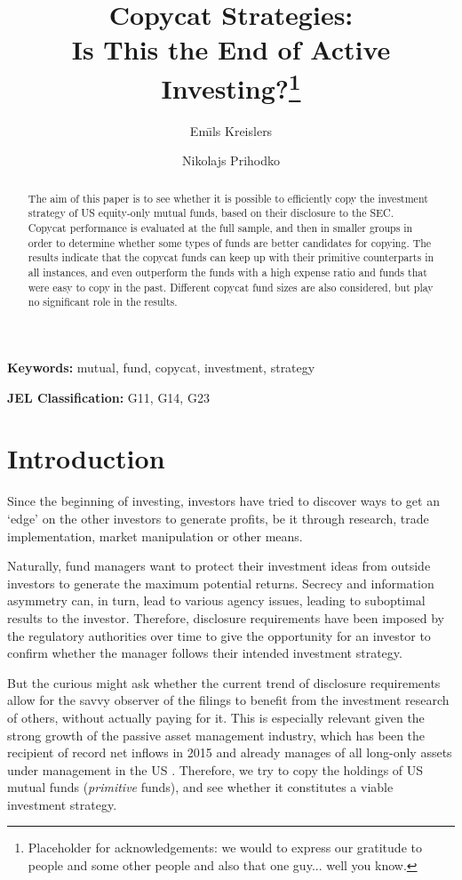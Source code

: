 \documentclass[12pt, a4]{article}
\title{Copycat Strategies:\\ Is This the End of Active Investing?\thanks{Placeholder for acknowledgements: we would to express our gratitude to people and some other people and also that one guy... well you know.}}
\author{Em\={\i}ls Kreislers \and Nikolajs Prihodko}
\date{\parbox{\linewidth}{\centering%
		Supervisor: Michael Halling\endgraf\vspace{6ex}
		Stockholm School of Economics\endgraf\medskip
		May 2016
		}}
\begin{document}
\maketitle

\begin{abstract} \noindent %
	The aim of this paper is to see whether it is possible to efficiently copy the investment strategy of \textsc{US} equity-only mutual funds, based on their disclosure to the \textsc{SEC}. Copycat performance is evaluated at the full sample, and then in smaller groups in order to determine whether some types of funds are better candidates for copying. The results indicate that the copycat funds can keep up with their primitive counterparts in all instances, and even outperform the funds with a high expense ratio and funds that were easy to copy in the past. Different copycat fund sizes are also considered, but play no significant role in the results.
\end{abstract}

\textbf{Keywords:} mutual, fund, copycat, investment, strategy
	
\textbf{\textsc{JEL} Classification:} G11, G14, G23

\newpage

\tableofcontents

\clearpage




\section {Introduction}

Since the beginning of investing, investors have tried to discover ways to get an `edge' on the other investors to generate profits, be it through research, trade implementation, market manipulation or other means.

Naturally, fund managers want to protect their investment ideas from outside investors to generate the maximum potential returns. Secrecy and information asymmetry can, in turn, lead to various agency issues, leading to suboptimal results to the investor. Therefore, disclosure requirements have been imposed by the regulatory authorities over time to give the opportunity for an investor to confirm whether the manager follows their intended investment strategy.

But the curious might ask whether the current trend of disclosure requirements allow for the savvy observer of the filings to benefit from the investment research of others, without actually paying for it. This is especially relevant given the strong growth of the passive asset management industry, which has been the recipient of record net inflows in 2015 and already manages  of all long-only assets under management in the \textsc{US} \citep{bloomberg}. Therefore, we try to copy the holdings of \textsc{US} mutual funds (\textit{primitive} funds), and see whether it constitutes a viable investment strategy.
\end{document}
